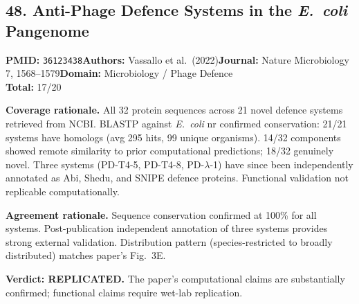 \subsection{48. Anti-Phage Defence Systems in the \textit{E.\ coli} Pangenome}
\textbf{PMID:} \texttt{36123438}\quad\textbf{Authors:} Vassallo et al.\ (2022)\quad\textbf{Journal:} Nature Microbiology 7, 1568--1579\quad\textbf{Domain:} Microbiology / Phage Defence\\
\quad{}\quad\textbf{Total:} 17/20\par\smallskip
\noindent\textbf{Coverage rationale.} All 32 protein sequences across 21 novel defence systems retrieved from NCBI. BLASTP against \textit{E.~coli} nr confirmed conservation: 21/21 systems have homologs (avg 295 hits, 99 unique organisms). 14/32 components showed remote similarity to prior computational predictions; 18/32 genuinely novel. Three systems (PD-T4-5, PD-T4-8, PD-$\lambda$-1) have since been independently annotated as Abi, Shedu, and SNIPE defence proteins. Functional validation not replicable computationally.\par
\noindent\textbf{Agreement rationale.} Sequence conservation confirmed at 100\% for all systems. Post-publication independent annotation of three systems provides strong external validation. Distribution pattern (species-restricted to broadly distributed) matches paper's Fig.~3E.\par\smallskip
\noindent\textbf{Verdict: REPLICATED.} The paper's computational claims are substantially confirmed; functional claims require wet-lab replication.

